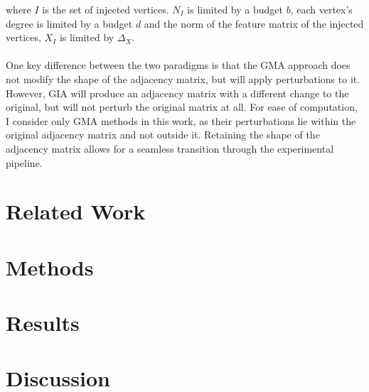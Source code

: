 \documentclass{article}
\begin{document}
where $I$ is the set of injected vertices. $N_I$ is limited by a budget $b$, each vertex's degree is limited by a budget $d$ and the norm of the feature matrix of the injected vertices, $X_I$ is limited by $\Delta_X$.
\\
\\
One key difference between the two paradigms is that the GMA approach does not modify the shape of the adjacency matrix, but will apply perturbations to it. However, GIA will produce an adjacency matrix with a different change to the original, but will not perturb the original matrix at all. For ease of computation, I consider only GMA methods in this work, as their perturbations lie within the original adjacency matrix and not outside it. Retaining the shape of the adjacency matrix allows for a seamless transition through the experimental pipeline.

\section{Related Work}
\label{RelatedWork}

\section{Methods}
\label{Methods}


\section{Results}
\label{Results}

\section{Discussion}
\label{Discussion}

\nocite{*}


\end{document}
